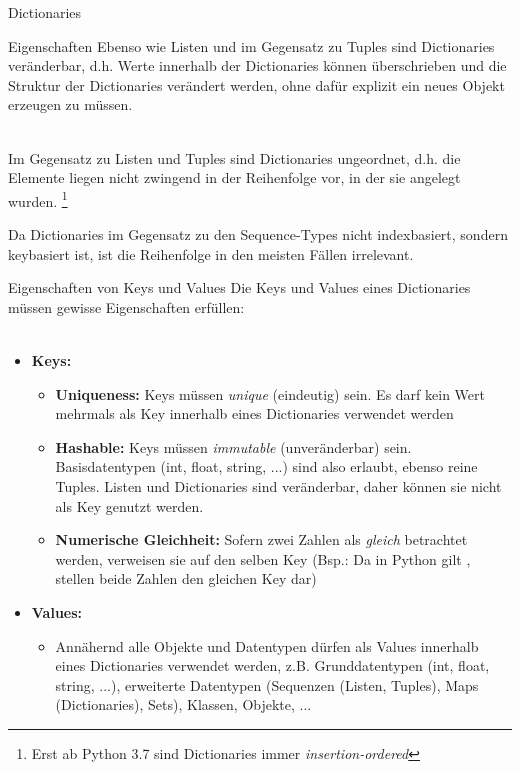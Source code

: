 \begin{subsection}{Dictionaries}
        \begin{frame}{Eigenschaften}
            Ebenso wie Listen und im Gegensatz zu Tuples sind Dictionaries veränderbar, d.h. Werte innerhalb der Dictionaries können überschrieben und die Struktur der Dictionaries verändert werden, ohne dafür explizit ein neues Objekt erzeugen zu müssen. \\~\
            
            Im Gegensatz zu Listen und Tuples sind Dictionaries ungeordnet, d.h. die Elemente liegen nicht zwingend in der Reihenfolge vor, in der sie angelegt wurden. \footnote{Erst ab Python 3.7 sind Dictionaries immer \textit{insertion-ordered}}
            
            Da Dictionaries im Gegensatz zu den Sequence-Types nicht indexbasiert, sondern keybasiert ist, ist die Reihenfolge in den meisten Fällen irrelevant.
            
        \end{frame}
        
        \begin{frame}{Eigenschaften von Keys und Values}
            Die Keys und Values eines Dictionaries müssen gewisse Eigenschaften erfüllen:\\~\
            
            \begin{itemize}
                \item \textbf{Keys:}
                    \begin{itemize}
                        \item \textbf{Uniqueness:} Keys müssen \textit{unique} (eindeutig) sein. Es darf kein Wert mehrmals als Key innerhalb eines Dictionaries verwendet werden
                        \item \textbf{Hashable:} Keys müssen \textit{immutable} (unveränderbar) sein. Basisdatentypen (int, float, string, ...) sind also erlaubt, ebenso reine Tuples. Listen und Dictionaries sind veränderbar, daher können sie nicht als Key genutzt werden.
                        \item \textbf{Numerische Gleichheit:} Sofern zwei Zahlen als \textit{gleich} betrachtet werden, verweisen sie auf den selben Key (Bsp.: Da in Python gilt , stellen beide Zahlen den gleichen Key dar)
                    \end{itemize}
                \item \textbf{Values:}
                    \begin{itemize}
                        \item Annähernd alle Objekte und Datentypen dürfen als Values innerhalb eines Dictionaries verwendet werden, z.B. Grunddatentypen (int, float, string, ...), erweiterte Datentypen (Sequenzen (Listen, Tuples), Maps (Dictionaries), Sets), Klassen, Objekte, ...
                    \end{itemize}
            \end{itemize}
        \end{frame}
        

\end{subsection}
